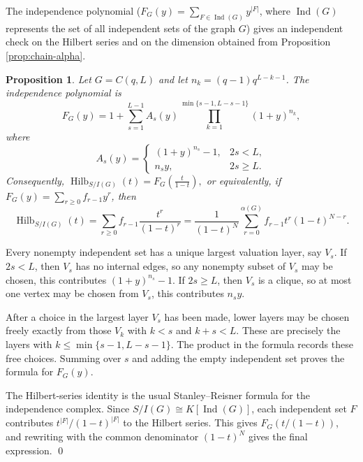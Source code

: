 \documentclass[12pt]{article}
\newtheorem{proposition}[theorem]{Proposition}
\theoremstyle{definition}
\renewenvironment{proof}{{\bf \noindent Proof.}}{\qed}
\begin{document}
\medskip

The independence polynomial ($ F_G(y)=\sum_{F\in \operatorname{Ind}(G)}y^{|F|} $, where $\operatorname{Ind}(G)$ represents the set of all independent sets of the graph $G$) gives an independent check on the Hilbert series and on the dimension obtained from Proposition \ref{prop:chain-alpha}.

\medskip

\begin{proposition}\label{prop:chain-independence-polynomial}
	Let $G=C(q,L)$ and let $n_k=(q-1)q^{L-k-1}$.  The independence polynomial 
	is
	$$
	F_G(y)=1+\sum_{s=1}^{L-1}A_s(y)\prod_{k=1}^{\min\{s-1,L-s-1\}}(1+y)^{n_k},
	$$
	where
	$$
	A_s(y)=
	\begin{cases}
		(1+y)^{n_s}-1, & 2s<L,\\[2pt]
		n_s y, & 2s\geq L.
	\end{cases}
	$$
	Consequently,
	$ \operatorname{Hilb}_{S/I(G)}(t)=F_G\left(\frac{t}{1-t}\right),$ or equivalently, if $F_G(y)=\sum_{r\geq 0}f_{r-1}y^r$, then
	$$
	\operatorname{Hilb}_{S/I(G)}(t)=\sum_{r\geq 0}f_{r-1}\frac{t^r}{(1-t)^r}
	=\frac{1}{(1-t)^N}\sum_{r=0}^{\alpha(G)}f_{r-1}t^r(1-t)^{N-r}.
	$$
\end{proposition}

\begin{proof}
	Every nonempty independent set has a unique largest valuation layer, say $V_s$.  If $2s<L$, then $V_s$ has no internal edges, so any nonempty subset of $V_s$ may be chosen, this contributes $(1+y)^{n_s}-1$.  If $2s\geq L$, then $V_s$ is a clique, so at most one vertex may be chosen from $V_s$, this contributes $n_s y$.
	
	After a choice in the largest layer $V_s$ has been made, lower layers may be chosen freely exactly from those $V_k$ with $k<s$ and $k+s<L$.  These are precisely the layers with
	$ k\leq \min\{s-1,L-s-1\}. $
	The product in the formula records these free choices.  Summing over $s$ and adding the empty independent set proves the formula for $F_G(y)$.
	
	\medskip
	
	The Hilbert-series identity is the usual Stanley--Reisner formula for the independence complex.  Since $S/I(G)\cong K[\operatorname{Ind}(G)]$, each independent set $F$ contributes $t^{|F|}/(1-t)^{|F|}$ to the Hilbert series.  This gives $F_G(t/(1-t))$, and rewriting with the common denominator $(1-t)^N$ gives the final expression.
\end{proof}
\end{document}
